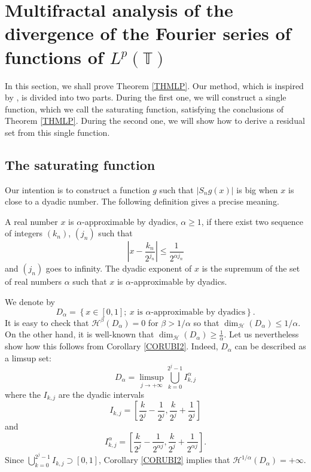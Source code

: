 \documentclass[11pt,a4paper]{amsart}
\theoremstyle{plain}
\begin{document}
\section{Multifractal analysis of the divergence of the Fourier series of functions of $L^p(\mathbb T)$}\label{SECLP}
In this section, we shall prove Theorem \ref{THMLP}. Our method, which is inspired by \cite{Jaf00a}, is divided into two parts.
During the first one, we will construct a single function, which we call the saturating function, satisfying the conclusions of
Theorem \ref{THMLP}. During the second one, we will show how to derive a residual set from this single function.

\subsection{The saturating function}\label{SECSATURATINGLP}
Our intention is to construct a function $g$ such that $|S_ng(x)|$ is big when $x$ is close to a dyadic number. The following
definition gives a precise meaning.
\begin{definition}
A real number $x$ is $\alpha$-approximable by dyadics, $\alpha\geq 1$, if there exist two sequence of integers $(k_n)$, $(j_n)$ 
such that
$$\left|x-\frac{k_n}{2^{j_n}}\right|\leq\frac{1}{2^{\alpha j_n}}$$
and $(j_n)$ goes to infinity. The dyadic exponent of $x$ is the supremum of the set of real numbers $\alpha$ such that $x$ is
$\alpha$-approximable by dyadics.
\end{definition}
We denote by
$$D_\alpha=\left\{x\in[0,1];\ \textrm{$x$ is $\alpha$-approximable by dyadics}\right\}.$$
It is easy to check that ${\mathcal H}^{\beta}(D_\alpha)=0$ for $\beta>1/\alpha$ so that $\dim_{\mathcal H}(D_\alpha)\le 1/\alpha$. On the other hand, it is well-known that $\dim_{\mathcal H}(D_\alpha) \geq\frac1\alpha$. 
Let us nevertheless show how this
follows from Corollary \ref{CORUBI2}. Indeed, $D_\alpha$ can be described as a limsup set:
$$D_\alpha=\limsup_{j\to+\infty}\bigcup_{k=0}^{2^j-1}I_{k,j}^\alpha$$
where the $I_{k,j}$ are the dyadic intervals
$$I_{k,j}=\left[\frac{k}{2^j}-\frac1{2^{j}},\frac{k}{2^j}+\frac1{2^{j}}\right]$$
and 
$$I_{k,j}^\alpha=\left[\frac{k}{2^{j}}-\frac1{2^{\alpha j}},\frac{k}{2^j}+\frac1{2^{\alpha j}}\right].$$
Since $\bigcup_{k=0}^{2^j-1}I_{k,j}\supset [0,1]$, Corollary \ref{CORUBI2} implies that 
${\mathcal H}^{1/\alpha}(D_\alpha)=+\infty$. 

\medskip
\end{document}
